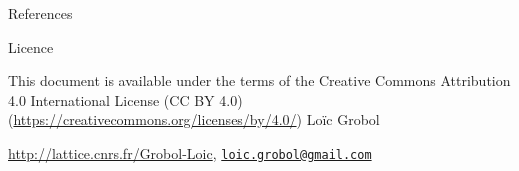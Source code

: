\documentclass[hyperref={unicode}, xcolor={svgnames}]{beamer}
\title{\titlepagetitle}
\author{\textbf{\myname}}
\institute{}
\date{\conference\\\docdate}
\begin{document}

\begin{frame}[plain]
	\titlepage
\end{frame}





\appendix
{}
\begin{frame}[allowframebreaks]{References}
    \printbibliography[heading=none]
\end{frame}

\begin{frame}{Licence}
  \begin{center}
	  {\huge \ccby}
	  \vfill
	  This document is available under the terms of the Creative Commons Attribution 4.0 International License (CC BY 4.0) (\url{https://creativecommons.org/licenses/by/4.0/})
	  \vfill
	  Loïc Grobol

	  \url{http://lattice.cnrs.fr/Grobol-Loic}, \href{mailto:loic.grobol@gmail.com}{\texttt{loic.grobol@gmail.com}}
  \end{center}
\end{frame}
\end{document}
